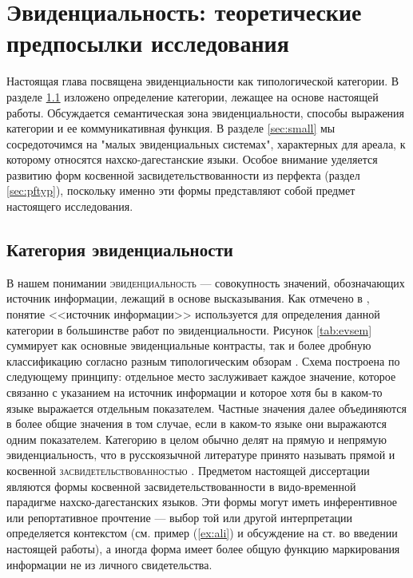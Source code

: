 

\color{purple}

\chapter{Эвиденциальность: теоретические предпосылки исследования} \label{sec:ch1}

Настоящая глава посвящена эвиденциальности как типологической категории. В разделе \ref{sec:cat} изложено определение категории, лежащее на основе настоящей работы. Обсуждается семантическая зона эвиденциальности, способы выражения категории и ее коммуникативная функция. В разделе \ref{sec:small} мы сосредоточимся на "малых эвиденциальных системах", характерных для ареала, к которому относятся нахско-дагестанские языки. Особое внимание уделяется развитию форм косвенной засвидетельствованности из перфекта (раздел \ref{sec:pftyp}), поскольку именно эти формы представляют собой предмет настоящего исследования.

\section{Категория эвиденциальности} \label{sec:cat}

В нашем понимании \textsc{эвиденциальность} --- совокупность значений, обозначающих источник информации, лежащий в основе высказывания. Как отмечено в \citep[263--264]{boye2018}, понятие <<источник информации>> используется для определения данной категории в большинстве работ по эвиденциальности. Рисунок \ref{tab:evsem} суммирует как основные эвиденциальные контрасты, так и более дробную классификацию согласно разным типологическим обзорам \citep{willett1988, aikhenvald2004, plungian2010}. Схема построена по следующему принципу: отдельное место заслуживает каждое значение, которое связанно с указанием на источник информации и которое хотя бы в каком-то языке выражается отдельным показателем. Частные значения далее объединяются в более общие значения в том случае, если в каком-то языке они выражаются одним показателем. Категорию в целом обычно делят на прямую и непрямую эвиденциальность, что в русскоязычной литературе принято называть прямой и косвенной \textsc{засвидетельствованностью} \citep{kozintseva2007}. Предметом настоящей диссертации являются формы косвенной засвидетельствованности в видо-временной парадигме нахско-дагестанских языков. Эти формы могут иметь инферентивное или репортативное прочтение --- выбор той или другой интерпретации определяется контекстом (см. пример (\ref{ex:ali}) и обсуждение на ст. \pageref{p:context} во введении настоящей работы), а иногда форма имеет более общую функцию маркирования информации не из личного свидетельства.

